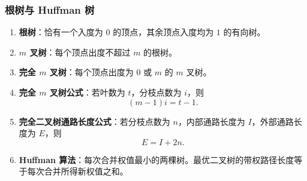 \subsubsection{根树与 Huffman 树}

\begin{enumerate}
	\item \textbf{根树}：恰有一个入度为 \(0\) 的顶点，其余顶点入度均为 \(1\) 的有向树。
	\item \textbf{\(m\) 叉树}：每个顶点出度不超过 \(m\) 的根树。
	\item \textbf{完全 \(m\) 叉树}：每个顶点出度为 \(0\) 或 \(m\) 的 \(m\) 叉树。
	\item \textbf{完全 \(m\) 叉树公式}：若叶数为 \(t\)，分枝点数为 \(i\)，则
	\[
	(m-1)i=t-1.
	\]
	\item \textbf{完全二叉树通路长度公式}：若分枝点数为 \(n\)，内部通路长度为 \(I\)，外部通路长度为 \(E\)，则
	\[
	E=I+2n.
	\]
	\item \textbf{Huffman 算法}：每次合并权值最小的两棵树。最优二叉树的带权路径长度等于每次合并所得新权值之和。
\end{enumerate}
